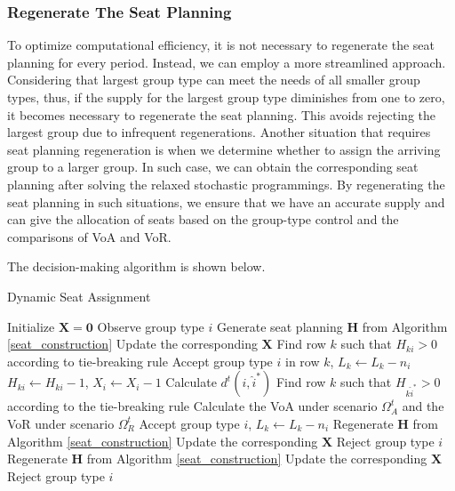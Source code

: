 \subsubsection{Regenerate The Seat Planning}
To optimize computational efficiency, it is not necessary to regenerate the seat planning for every period. Instead, we can employ a more streamlined approach. Considering that largest group type can meet the needs of all smaller group types, thus, if the supply for the largest group type diminishes from one to zero, it becomes necessary to regenerate the seat planning. This avoids rejecting the largest group due to infrequent regenerations. Another situation that requires seat planning regeneration is when we determine whether to assign the arriving group to a larger group. In such case, we can obtain the corresponding seat planning after solving the relaxed stochastic programmings. By regenerating the seat planning in such situations, we ensure that we have an accurate supply and can give the allocation of seats based on the group-type control and the comparisons of VoA and VoR.


The decision-making algorithm is shown below.

\begin{algorithm}[H]
  \caption{Dynamic Seat Assignment}
  {Initialize $\bm{X} = \bm{0}$\;
    Observe group type $i$\;
   {Generate seat planning $\bm{H}$ from Algorithm \ref{seat_construction}\; Update the corresponding $\bm{X}$}
    {Find row $k$ such that $H_{ki} >0$ according to tie-breaking rule\; Accept group type $i$ in row $k$, $L_{k} \gets L_{k} -n_{i}$\; $H_{ki} \gets H_{ki} -1$, $X_{i} \gets X_{i} -1$}
    {Calculate $d^{t}(i, \hat{i}^{*})$\;
    {Find row $k$ such that $H_{k \hat{i}^{*}} > 0$ according to the tie-breaking rule\; 
    Calculate the VoA under scenario $\Omega^{t}_{A}$ and the VoR under scenario $\Omega^{t}_{R}$\;
    {Accept group type $i$, $L_{k} \gets L_{k} - n_{i}$\; Regenerate $\bm{H}$ from Algorithm \ref{seat_construction}\; Update the corresponding $\bm{X}$\;}
    {Reject group type $i$\; Regenerate $\bm{H}$ from Algorithm \ref{seat_construction}\; Update the corresponding $\bm{X}$\;}}
    {Reject group type $i$\;}
    }}
\end{algorithm}
